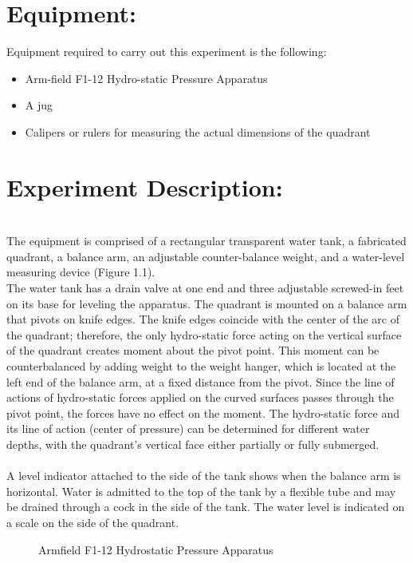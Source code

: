 \documentclass[12pt,a4paper]{article}
\begin{document}
\section{Equipment:}
Equipment required to carry out this experiment is the following:
\begin{itemize}
\item Arm-field F1-12 Hydro-static Pressure Apparatus
\item A jug
\item Calipers or rulers for measuring the actual dimensions of the quadrant
\end{itemize}
\section{Experiment Description:}
\\The equipment is comprised of a rectangular transparent water tank, a fabricated quadrant, a balance arm, an adjustable counter-balance weight, and a water-level measuring device (Figure 1.1).
\\The water tank has a drain valve at one end and three adjustable screwed-in feet on its base for leveling the apparatus. The quadrant is mounted on a balance arm that pivots on knife edges. The knife edges coincide with the center of the arc of the quadrant; therefore, the only hydro-static force acting on the vertical surface of the quadrant creates moment about the pivot point. This moment can be counterbalanced by adding weight to the weight hanger, which is located at the left end of the balance arm, at a fixed distance from the pivot. Since the line of actions of hydro-static forces applied on the curved surfaces passes through the pivot point, the forces have no effect on the moment. The hydro-static force and its line of action (center of pressure) can be determined for different water depths, with the quadrant’s vertical face either partially or fully submerged.\\
\\A level indicator attached to the side of the tank shows when the balance arm is horizontal. Water is admitted to the top of the tank by a flexible tube and may be drained through a cock in the side of the tank. The water level is indicated on a scale on the side of the quadrant.\\
\clearpage
\begin{figure}[!ht]
	\begin{center}
	\end{center}
	\caption{Armfield F1-12 Hydrostatic Pressure Apparatus}
	\label{Armfield F1-12 Hydrostatic Pressure Apparatus}
\end{figure}
\end{document}

